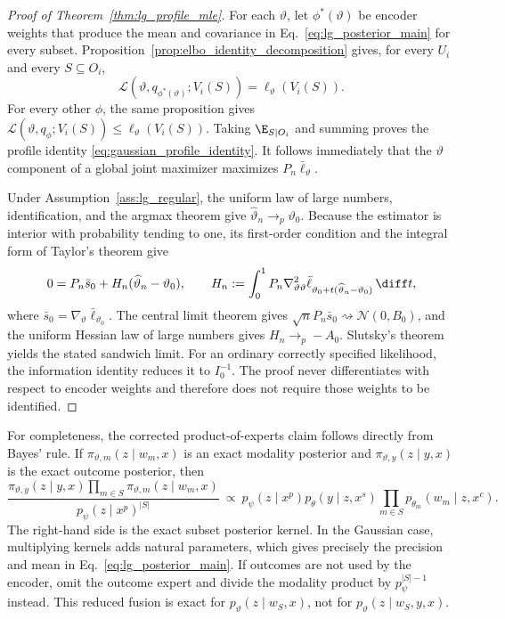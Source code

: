 \begin{proof}[Proof of Theorem~\ref{thm:lg_profile_mle}]
For each $\vartheta$, let $\phi^*(\vartheta)$ be encoder weights that produce
the mean and covariance in Eq.~\eqref{eq:lg_posterior_main} for every subset.
Proposition~\ref{prop:elbo_identity_decomposition} gives, for every $U_i$ and
every $S\subseteq O_i$,
\[
 \mathcal L(\vartheta,q_{\phi^*(\vartheta)};V_i(S))
 =\ell_\vartheta(V_i(S)).
\]
For every other $\phi$, the same proposition gives
$\mathcal L(\vartheta,q_\phi;V_i(S))\le\ell_\vartheta(V_i(S))$.
Taking $\E_{S\mid O_i}$ and summing proves the profile identity
\eqref{eq:gaussian_profile_identity}.  It follows immediately that the
$\vartheta$ component of a global joint maximizer maximizes
$P_n\bar\ell_\vartheta$.

Under Assumption~\ref{ass:lg_regular}, the uniform law of large numbers,
identification, and the argmax theorem give
$\widehat\vartheta_n\to_p\vartheta_0$.  Because the estimator is interior
with probability tending to one, its first-order condition and the integral
form of Taylor's theorem give
\[
 0=P_n\bar s_0+H_n(\widehat\vartheta_n-\vartheta_0),
 \qquad
 H_n:=\int_0^1P_n\nabla^2_{\vartheta\vartheta}
 \bar\ell_{\vartheta_0+t(\widehat\vartheta_n-\vartheta_0)}\,\diff t,
\]
where $\bar s_0=\nabla_\vartheta\bar\ell_{\vartheta_0}$.  The central limit
theorem gives $\sqrt nP_n\bar s_0\rightsquigarrow\mathcal N(0,B_0)$, and the
uniform Hessian law of large numbers gives $H_n\to_p-A_0$.  Slutsky's theorem
yields the stated sandwich limit.  For an ordinary correctly specified
likelihood, the information identity reduces it to $I_0^{-1}$.  The proof
never differentiates with respect to encoder weights and therefore does not
require those weights to be identified.
\end{proof}

For completeness, the corrected product-of-experts claim follows directly
from Bayes' rule.  If $\pi_{\vartheta,m}(z\mid w_m,x)$ is an exact modality
posterior and $\pi_{\vartheta,y}(z\mid y,x)$ is the exact outcome posterior,
then
\[
 \frac{\pi_{\vartheta,y}(z\mid y,x)
 \prod_{m\in S}\pi_{\vartheta,m}(z\mid w_m,x)}
 {p_\psi(z\mid x^p)^{|S|}}
 \ \propto\ 
 p_\psi(z\mid x^p)p_\theta(y\mid z,x^s)
 \prod_{m\in S}p_{\theta_m}(w_m\mid z,x^c).
\]
The right-hand side is the exact subset posterior kernel.  In the Gaussian
case, multiplying kernels adds natural parameters, which gives precisely the
precision and mean in Eq.~\eqref{eq:lg_posterior_main}.  If outcomes are not
used by the encoder, omit the outcome expert and divide the modality product
by $p_\psi^{|S|-1}$ instead.  This reduced fusion is exact for
$p_\vartheta(z\mid w_S,x)$, not for $p_\vartheta(z\mid w_S,y,x)$.

